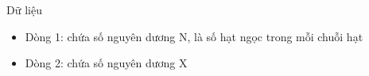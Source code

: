 Dữ liệu  
\begin{itemize}
	\item     Dòng 1: chứa số nguyên dương N, là số hạt ngọc trong mỗi chuỗi hạt   
	\item     Dòng 2: chứa số nguyên dương X   
\end{itemize}